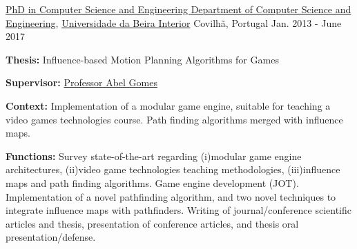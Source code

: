 

\begin{cventries}

\vspace{-0.25cm}

  \cventry
    {\href{https://www.ubi.pt/en/course/849}{PhD in Computer Science and Engineering %
    }} %
    {\href{https://www.di.ubi.pt/}{Department of Computer Science and Engineering}, \href{http://www.ubi.pt/}{Universidade da Beira Interior}} %
    {Covilh\~{a}, Portugal} %
    {Jan. 2013 - June 2017} %
    {
      \begin{cvitems} %
        \item[] {\textbf{Thesis:} Influence-based Motion Planning Algorithms for Games}
        \item[] {\textbf{Supervisor:} \href{http://www.di.ubi.pt/~agomes/}{Professor Abel Gomes}}
        \item[] {\textbf{Context:} Implementation of a modular game engine, suitable for teaching a video games technologies course.%
        Path finding algorithms merged with influence maps.}
        \item[] {\textbf{Functions:} Survey state-of-the-art regarding (i)modular game engine architectures, (ii)video game technologies teaching methodologies, (iii)influence maps and path finding algorithms. %
        Game engine development (JOT). %
        Implementation of a novel pathfinding algorithm, and two novel techniques to integrate influence maps with pathfinders. Writing of journal/conference scientific articles and thesis, presentation of conference articles, and thesis oral presentation/defense.}

\end{cvitems}}
\end{cventries}
